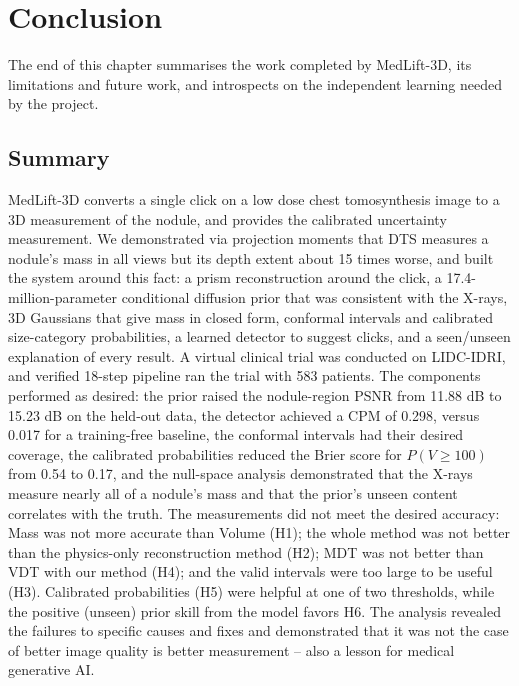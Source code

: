 \chapter{Conclusion}
\label{ch:conclusion}

The end of this chapter summarises the work completed by MedLift-3D, its limitations and future work, and introspects on the independent learning needed by the project.

\section{Summary}

MedLift-3D converts a single click on a low dose chest tomosynthesis image to a 3D measurement of the nodule, and provides the calibrated uncertainty measurement. We demonstrated via projection moments that DTS measures a nodule's mass in all views but its depth extent about 15 times worse, and built the system around this fact: a prism reconstruction around the click, a 17.4-million-parameter conditional diffusion prior that was consistent with the X-rays, 3D Gaussians that give mass in closed form, conformal intervals and calibrated size-category probabilities, a learned detector to suggest clicks, and a seen/unseen explanation of every result. A virtual clinical trial was conducted on LIDC-IDRI, and verified 18-step pipeline ran the trial with 583 patients. The components performed as desired: the prior raised the nodule-region PSNR from 11.88 dB to 15.23 dB on the held-out data, the detector achieved a CPM of 0.298, versus 0.017 for a training-free baseline, the conformal intervals had their desired coverage, the calibrated probabilities reduced the Brier score for $P(V\geq100)$ from 0.54 to 0.17, and the null-space analysis demonstrated that the X-rays measure nearly all of a nodule's mass and that the prior's unseen content correlates with the truth. The measurements did not meet the desired accuracy: Mass was not more accurate than Volume (H1); the whole method was not better than the physics-only reconstruction method (H2); MDT was not better than VDT with our method (H4); and the valid intervals were too large to be useful (H3). Calibrated probabilities (H5) were helpful at one of two thresholds, while the positive (unseen) prior skill from the model favors H6. The analysis revealed the failures to specific causes and fixes and demonstrated that it was not the case of better image quality is better measurement -- also a lesson for medical generative AI.

